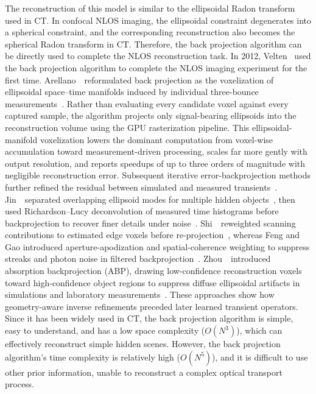 The reconstruction of this model is similar to the ellipsoidal Radon transform used in CT. In confocal NLOS imaging, the ellipsoidal constraint degenerates into a spherical constraint, and the corresponding reconstruction also becomes the spherical Radon transform in CT. Therefore, the back projection algorithm can be directly used to complete the NLOS reconstruction task. In 2012, Velten \etal~used the back projection algorithm to complete the NLOS imaging experiment for the first time\cite{veltenRecoveringThreedimensionalShape2012}. Arellano~\etal~reformulated back projection as the voxelization of ellipsoidal space--time manifolds induced by individual three-bounce measurements~\cite{arellanoFastBackprojectionNonline2017}. Rather than evaluating every candidate voxel against every captured sample, the algorithm projects only signal-bearing ellipsoids into the reconstruction volume using the GPU rasterization pipeline. This ellipsoidal-manifold voxelization lowers the dominant computation from voxel-wise accumulation toward measurement-driven processing, scales far more gently with output resolution, and reports speedups of up to three orders of magnitude with negligible reconstruction error. Subsequent iterative error-backprojection methods further refined the residual between simulated and measured transients~\cite{mannaErrorBackprojectionAlgorithms2018}. Jin~\etal~separated overlapping ellipsoid modes for multiple hidden objects~\cite{jinReconstructionMultipleNonlineofsight2018}, then used Richardson--Lucy deconvolution of measured time histograms before backprojection to recover finer details under noise~\cite{jinRichardsonLucyNLOS2018}. Shi~\etal~reweighted scanning contributions to estimated edge voxels before re-projection~\cite{shiEdgeReprojectionNLOS2020}, whereas Feng and Gao introduced aperture-apodization and spatial-coherence weighting to suppress streaks and photon noise in filtered backprojection~\cite{fengGaoWeightingNLOS2020}. Zhou~\etal~introduced absorption backprojection (ABP), drawing low-confidence reconstruction voxels toward high-confidence object regions to suppress diffuse ellipsoidal artifacts in simulations and laboratory measurements~\cite{zhouAbsorptionBackprojectionNLOS2023}. These approaches show how geometry-aware inverse refinements preceded later learned transient operators. Since it has been widely used in CT, the back projection algorithm is simple, easy to understand, and has a low space complexity ($O(N^3)$), which can effectively reconstruct simple hidden scenes. However, the back projection algorithm's time complexity is relatively high ($O(N^5)$), and it is difficult to use other prior information, unable to reconstruct a complex optical transport process.

